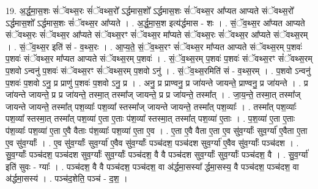 \documentclass[17pt]{extarticle}
\begin{document}
19. अ॒र्द्ध॒मा॒स॒शः सं॑ॅवथ्स॒रः सं॑ॅवथ्स॒रो᳚ ऽर्द्धमास॒शो᳚ ऽर्द्धमास॒शः सं॑ॅवथ्स॒र आ᳚प्यत आप्यते संॅवथ्स॒रो᳚ ऽर्द्धमास॒शो᳚ ऽर्द्धमास॒शः सं॑ॅवथ्स॒र आ᳚प्यते । . अ॒र्द्ध॒मा॒स॒श इत्य॑र्द्धमास - शः । . सं॒ॅव॒थ्स॒र आ᳚प्यत आप्यते संॅवथ्स॒रः सं॑ॅवथ्स॒र आ᳚प्यते संॅवथ्स॒रꣳ सं॑ॅवथ्स॒र मा᳚प्यते संॅवथ्स॒रः सं॑ॅवथ्स॒र आ᳚प्यते संॅवथ्स॒रम् । . सं॒ॅव॒थ्स॒र इति॑ सं - व॒थ्स॒रः । . आ॒प्य॒ते॒ सं॒ॅव॒थ्स॒रꣳ सं॑ॅवथ्स॒र मा᳚प्यत आप्यते संॅवथ्स॒रम् प॒शवः॑ प॒शवः॑ संॅवथ्स॒र मा᳚प्यत आप्यते संॅवथ्स॒रम् प॒शवः॑ । . सं॒ॅव॒थ्स॒रम् प॒शवः॑ प॒शवः॑ संॅवथ्स॒रꣳ सं॑ॅवथ्स॒रम् प॒शवो ऽन्वनु॑ प॒शवः॑ संॅवथ्स॒रꣳ सं॑ॅवथ्स॒रम् प॒शवो ऽनु॑ । . सं॒ॅव॒थ्स॒रमिति॑ सं - व॒थ्स॒रम् । . प॒शवो ऽन्वनु॑ प॒शवः॑ प॒शवो ऽनु॒ प्र प्राणु॑ प॒शवः॑ प॒शवो ऽनु॒ प्र । . अनु॒ प्र प्राण्वनु॒ प्र जा॑यन्ते जायन्ते॒ प्राण्वनु॒ प्र जा॑यन्ते । . प्र जा॑यन्ते जायन्ते॒ प्र प्र जा॑यन्ते॒ तस्मा॒त् तस्मा᳚ज् जायन्ते॒ प्र प्र जा॑यन्ते॒ तस्मा᳚त् । . जा॒य॒न्ते॒ तस्मा॒त् तस्मा᳚ज् जायन्ते जायन्ते॒ तस्मा᳚त् पश॒व्याः᳚ पश॒व्या᳚ स्तस्मा᳚ज् जायन्ते जायन्ते॒ तस्मा᳚त् पश॒व्याः᳚ । . तस्मा᳚त् पश॒व्याः᳚ पश॒व्या᳚ स्तस्मा॒त् तस्मा᳚त् पश॒व्या॑ ए॒ता ए॒ताः प॑श॒व्या᳚ स्तस्मा॒त् तस्मा᳚त् पश॒व्या॑ ए॒ताः । . प॒श॒व्या॑ ए॒ता ए॒ताः प॑श॒व्याः᳚ पश॒व्या॑ ए॒ता ए॒वै वैताः प॑श॒व्याः᳚ पश॒व्या॑ ए॒ता ए॒व । . ए॒ता ए॒वै वैता ए॒ता ए॒व सु॑व॒र्ग्याः᳚ सुव॒र्ग्या॑ ए॒वैता ए॒ता ए॒व सु॑व॒र्ग्याः᳚ । . ए॒व सु॑व॒र्ग्याः᳚ सुव॒र्ग्या॑ ए॒वैव सु॑व॒र्ग्याः᳚ पञ्च॑दश॒ पञ्च॑दश सुव॒र्ग्या॑ ए॒वैव सु॑व॒र्ग्याः᳚ पञ्च॑दश । . सु॒व॒र्ग्याः᳚ पञ्च॑दश॒ पञ्च॑दश सुव॒र्ग्याः᳚ सुव॒र्ग्याः᳚ पञ्च॑दश॒ वै वै पञ्च॑दश सुव॒र्ग्याः᳚ सुव॒र्ग्याः᳚ पञ्च॑दश॒ वै । . सु॒व॒र्ग्या॑ इति॑ सुवः - ग्याः᳚ । . पञ्च॑दश॒ वै वै पञ्च॑दश॒ पञ्च॑दश॒ वा अ॑र्द्धमा॒सस्या᳚ र्द्धमा॒सस्य॒ वै पञ्च॑दश॒ पञ्च॑दश॒ वा अ॑र्द्धमा॒सस्य॑ । . पञ्च॑द॒शेति॒ पञ्च॑ - द॒श॒ । \newline
\end{document}
